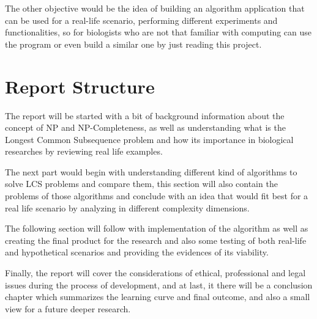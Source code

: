 \documentclass[11pt]{informatics-report}
\begin{document}
The other objective would be the idea of building an algorithm application that can be used for a real-life scenario,
performing different experiments and functionalities, so for biologists who are not that familiar with computing can 
use the program or even build a similar one by just reading this project. 


\section{Report Structure}

The report will be started with a bit of background information about the concept of NP and NP-Completeness, as well
as understanding what is the Longest Common Subsequence problem and how its importance in biological researches by 
reviewing real life examples.

The next part would begin with understanding different kind of algorithms to solve LCS problems and compare them, this
section will also contain the problems of those algorithms and conclude with an idea that would fit best for a real life
scenario by analyzing in different complexity dimensions.

The following section will follow with implementation of the algorithm as well as creating the final product for the
research and also some testing of both real-life and hypothetical scenarios and providing the evidences of its viability.

Finally, the report will cover the considerations of ethical, professional and legal issues during the process of
development, and at last, it there will be a conclusion chapter which summarizes the learning curve and final outcome,
and also a small view for a future deeper research. 












\appendix



\end{document}
